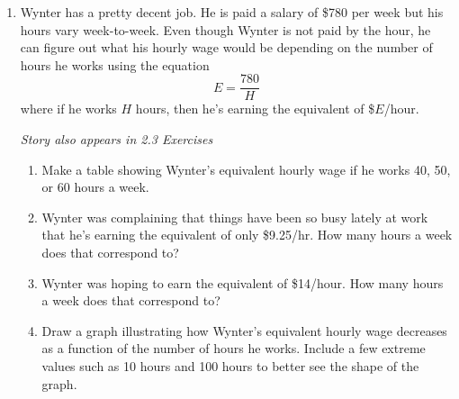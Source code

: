 \begin{enumerate}
\item Wynter has a pretty decent job. He is paid a salary of \$780 per week but his hours vary week-to-week. Even though Wynter is not paid by the hour, he can figure out what his hourly wage would be depending on the number of hours he works using the equation $$E = \frac{780}{H}$$ where if he works $H$ hours, then he's earning the equivalent of \$$E$/hour.

\hfill \emph{Story also appears in 2.3 Exercises}
\begin{enumerate}
\item Make a table showing Wynter's equivalent hourly wage if he works 40, 50, or 60 hours a week.
\item Wynter was complaining that things have been so busy lately at work that he's earning the equivalent of only \$9.25/hr.  How many hours a week does that correspond to?
\item Wynter was hoping to earn the equivalent of \$14/hour.  How many hours a week does that correspond to?  
\item Draw a graph illustrating how Wynter's equivalent hourly wage decreases as a function of the number of hours he works.  Include a few extreme values such as 10 hours and 100 hours to better see the shape of the graph.
\end{enumerate}


\end{enumerate}
